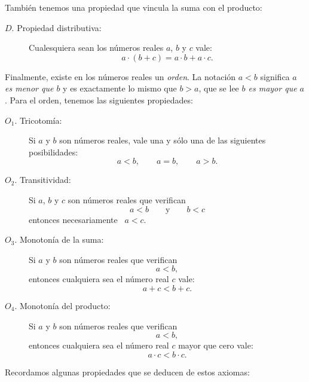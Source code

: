 También tenemos una propiedad que vincula la suma con el producto:

\begin{description}
    \item[$D$. Propiedad distributiva:] Cualesquiera sean los números reales $a$, $b$ y $c$ vale:
    \[ a\cdot(b+c) = a\cdot b+a\cdot c.\]
\end{description}

Finalmente, existe en los números reales un \emph{orden}. La notación $a<b$ significa
\emph{$a$ es menor que $b$} y es exactamente lo mismo que $b>a$, que se lee \emph{$b$ es mayor que $a$}. Para el orden, tenemos las siguientes propiedades:

\begin{description}
    \item[$O_1$. Tricotomía:] Si $a$ y $b$ son números reales, vale una y sólo una de las siguientes posibilidades:
    \[
    a<b,\qquad a=b, \qquad a>b.
    \]

    \item[$O_2$. Transitividad:] Si $a$, $b$ y $c$ son números reales que verifican
    \[ a<b \qquad\text{y}\qquad b<c\]
    entonces necesariamente \ $a<c$.

    \item[$O_3$. Monotonía de la suma:] Si $a$ y $b$ son números reales que verifican
    \[ a<b, \]
    entonces cualquiera sea el número real $c$ vale:
    \[ a+c < b+c.\]

    \item[$O_4$. Monotonía del producto:] Si $a$ y $b$ son números reales que verifican
    \[ a<b, \]
    entonces cualquiera sea el número real $c$ mayor que cero vale:
    \[ a \cdot c < b \cdot c.\]


\end{description}


Recordamos algunas propiedades que se deducen de estos axiomas:

